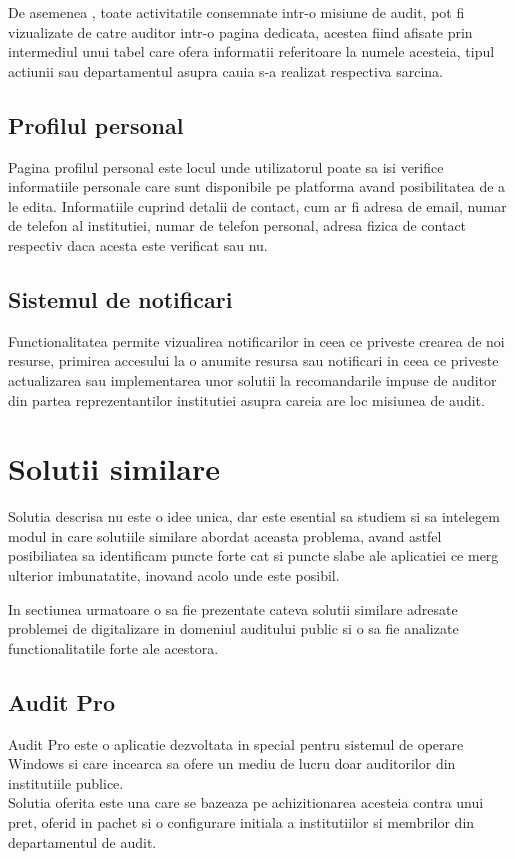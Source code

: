 	 De asemenea , toate activitatile consemnate intr-o misiune de audit, pot fi vizualizate de catre auditor intr-o pagina dedicata, acestea fiind afisate prin intermediul unui tabel care ofera informatii referitoare la numele acesteia, tipul actiunii sau departamentul asupra cauia s-a realizat respectiva sarcina.
	 
	
	\subsection{Profilul personal}
	Pagina profilul personal este locul unde utilizatorul poate sa isi verifice informatiile personale care sunt disponibile pe platforma avand posibilitatea de a le edita. Informatiile cuprind detalii de contact, cum ar fi adresa de email, numar de telefon al institutiei, numar de telefon personal, adresa fizica de contact respectiv daca acesta este verificat sau nu.
 
	
	\subsection{Sistemul de notificari}
		Functionalitatea permite vizualirea notificarilor in ceea ce priveste crearea de noi resurse, primirea accesului la o anumite resursa sau notificari in ceea ce priveste actualizarea sau implementarea unor solutii la recomandarile impuse de auditor din partea reprezentantilor institutiei asupra careia are loc misiunea de audit.


	\section{Solutii similare}
	Solutia descrisa nu este o idee unica, dar este esential sa studiem si sa intelegem modul in care solutiile similare abordat aceasta problema, avand astfel posibiliatea sa identificam puncte forte cat si puncte slabe ale aplicatiei ce merg ulterior imbunatatite, inovand acolo unde este posibil.
	
	In sectiunea urmatoare o sa fie prezentate cateva solutii similare adresate problemei de digitalizare in domeniul auditului public si o sa fie analizate functionalitatile forte ale acestora. 
	
	\subsection*{Audit Pro}
	
	Audit Pro este o aplicatie dezvoltata in special pentru sistemul de operare Windows si care incearca sa ofere un mediu de lucru doar auditorilor din institutiile publice.\\
	Solutia oferita este una care se bazeaza pe achizitionarea acesteia contra unui pret, oferid in pachet si o configurare initiala a institutiilor si membrilor din departamentul de audit.
	
